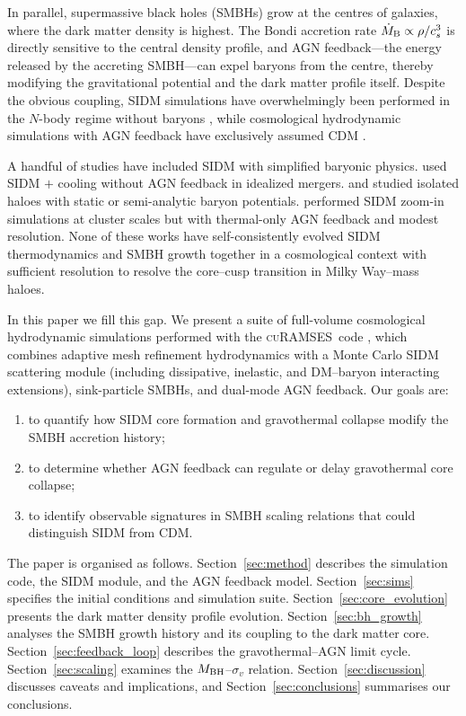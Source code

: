 \documentclass[fleqn,usenatbib]{mnras}
\newcommand{\curamses}{\textsc{cuRAMSES}}
\newcommand{\MBH}{M_{\rm BH}}
\newcommand{\vdisp}{\sigma_v}
\begin{document}
In parallel, supermassive black holes (SMBHs) grow at the centres of
galaxies, where the dark matter density is highest.  The Bondi
accretion rate $\dot{M}_{\rm B} \propto \rho / c_s^3$ is directly
sensitive to the central density profile, and AGN feedback---the
energy released by the accreting SMBH---can expel baryons from the
centre, thereby modifying the gravitational potential and the dark
matter profile itself.  Despite the obvious coupling, SIDM simulations
have overwhelmingly been performed in the $N$-body regime without
baryons \citep{Rocha2013,Vogelsberger2012,Robertson2017a}, while
cosmological hydrodynamic simulations with AGN feedback have
exclusively assumed CDM
\citep{Dubois2014,Schaye2015,Pillepich2018,Dave2019}.

A handful of studies have included SIDM with simplified baryonic
physics.  \citet{Fry2015} used SIDM $+$ cooling without AGN feedback
in idealized mergers.  \citet{Robertson2018} and \citet{Sameie2021}
studied isolated haloes with static or semi-analytic baryon potentials.
\citet{Despali2022} performed SIDM zoom-in simulations at cluster
scales but with thermal-only AGN feedback and modest resolution.  None
of these works have self-consistently evolved SIDM thermodynamics and
SMBH growth together in a cosmological context with sufficient
resolution to resolve the core--cusp transition in Milky Way--mass
haloes.

In this paper we fill this gap.  We present a suite of full-volume
cosmological hydrodynamic simulations performed with the \curamses\
code \citep{Kim2024}, which combines adaptive mesh refinement
hydrodynamics with a Monte Carlo SIDM scattering module (including
dissipative, inelastic, and DM--baryon interacting extensions),
sink-particle SMBHs, and dual-mode AGN feedback.  Our goals are:
\begin{enumerate}
  \item to quantify how SIDM core formation and gravothermal collapse
    modify the SMBH accretion history;
  \item to determine whether AGN feedback can regulate or delay
    gravothermal core collapse;
  \item to identify observable signatures in SMBH scaling relations
    that could distinguish SIDM from CDM.
\end{enumerate}

The paper is organised as follows.  Section~\ref{sec:method} describes
the simulation code, the SIDM module, and the AGN feedback model.
Section~\ref{sec:sims} specifies the initial conditions and simulation
suite.  Section~\ref{sec:core_evolution} presents the dark matter
density profile evolution.  Section~\ref{sec:bh_growth} analyses the
SMBH growth history and its coupling to the dark matter core.
Section~\ref{sec:feedback_loop} describes the gravothermal--AGN limit
cycle.  Section~\ref{sec:scaling} examines the $\MBH$--$\vdisp$
relation.  Section~\ref{sec:discussion} discusses caveats and
implications, and Section~\ref{sec:conclusions} summarises our
conclusions.
\end{document}

